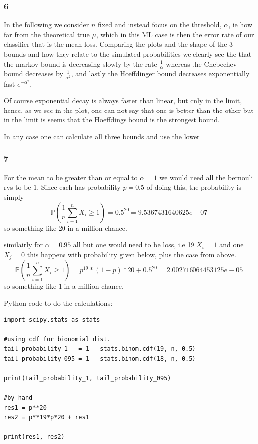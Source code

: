\documentclass[a4paper,12pt]{article}
\begin{document}
\subsubsection*{6}
In the following we consider $n$ fixed and instead focus on the threshold, $\alpha$, ie how far from the theoretical true $\mu$, which in this ML case is then the error rate of our classifier that is the mean loss.
Comparing the plots and the shape of the 3 bounds and how they relate to the simulated probabilities we clearly see the that the markov bound is decreasing slowly by the rate $\frac{1}{\alpha}$ whereas the Chebechev bound decreases by $\frac{1}{\alpha^2}$, and lastly the Hoeffdinger bound decreases exponentially fast $e^{-\alpha^2}$.

Of course exponential decay is always faster than linear, but only in the limit, hence, as we see in the plot, one can not say that one is better than the other but in the limit is seems that the Hoeffdings bound is the strongest bound.

In any case one can calculate all three bounds and use the lower

\subsubsection*{7}
For the mean to be greater than or equal to $\alpha = 1$ we would need all the bernouli rvs to be $1$. Since each has probability $p = 0.5$ of doing this, the probability is simply
$$
\mathbb{P}\left(  \frac{1}{n}\sum_{i = 1}^nX_i \geq 1 \right) = 0.5^{20} = 9.5367431640625e-07
$$
so something like 20 in a million chance.


similairly for $\alpha = 0.95$ all but one would need to be loss, i.e 19 $X_i = 1$ and one $X_j = 0$
this happens with probability given below, plus the case from  above.
$$
\mathbb{P}\left(  \frac{1}{n}\sum_{i = 1}^nX_i \geq 1 \right) = p^{19}*(1-p)*20 + 0.5^20 = 2.002716064453125e-05
$$
so something like 1 in a million chance.

Python code to do the calculations:
\begin{lstlisting}
import scipy.stats as stats

#using cdf for bionomial dist.
tail_probability_1   = 1 - stats.binom.cdf(19, n, 0.5)
tail_probability_095 = 1 - stats.binom.cdf(18, n, 0.5)

print(tail_probability_1, tail_probability_095)

#by hand
res1 = p**20
res2 = p**19*p*20 + res1

print(res1, res2)
\end{lstlisting}
\end{document}

